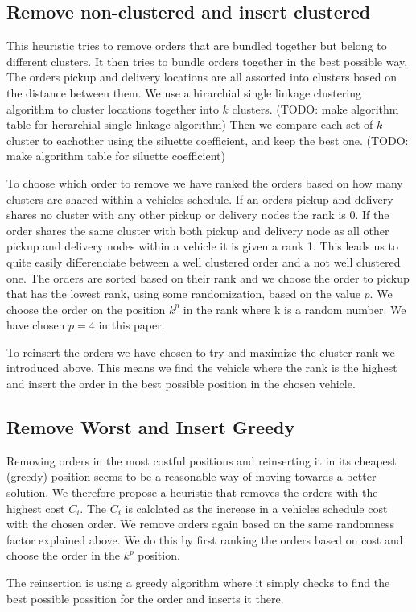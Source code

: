 \documentclass[../main.tex]{subfiles}
\begin{document}
\subsection{Remove non-clustered and insert clustered}
\label{sec:clust}
This heuristic tries to remove orders that are bundled together but belong to different clusters. It then tries to bundle orders together in the best possible way.
The orders pickup and delivery locations are all assorted into clusters based on the distance between them. 
We use a hirarchial single linkage clustering algorithm to cluster locations together into $k$ clusters. (TODO: make algorithm table for herarchial single linkage algorithm) 
Then we compare each set of $k$ cluster to eachother using the siluette coefficient, and keep the best one. (TODO: make algorithm table for siluette coefficient) \newlinw \par
To choose which order to remove we have ranked the orders based on how many clusters are shared within a vehicles schedule.
If an orders pickup and delivery shares no cluster with any other pickup or delivery nodes the rank is 0. 
If the order shares the same cluster with both pickup and delivery node as all other pickup and delivery nodes within a vehicle it is given a rank 1.  
This leads us to quite easily differenciate between a well clustered order and a not well clustered one.
The orders are sorted based on their rank and we choose the order to pickup that has the lowest rank, using some randomization, based on the value $p$. 
We choose the order on the position $k^p$ in the rank where k is a random number. 
We have chosen $p=4$ in this paper.  \newline \par
To reinsert the orders we have chosen to try and maximize the cluster rank we introduced above. This means we find the vehicle where the rank is the highest and insert the order in the best possible position in the chosen vehicle. 

\subsection{Remove Worst and Insert Greedy}
\label{sec:greedy}
Removing orders in the most costful positions and reinserting it in its cheapest (greedy) position seems to be a reasonable way of moving towards a better solution.
We therefore propose a heuristic that removes the orders with the highest cost $C_{i}$.
The $C_i$ is calclated as the increase in a vehicles schedule cost with the chosen order.
We remove orders again based on the same randomness factor explained above. We do this by first ranking the orders based on cost and choose the order in the $k^p$ position. \newline \par
The reinsertion is using a greedy algorithm where it simply checks to find the best possible possition for the order and inserts it there. 
\newline 
\end{document}
